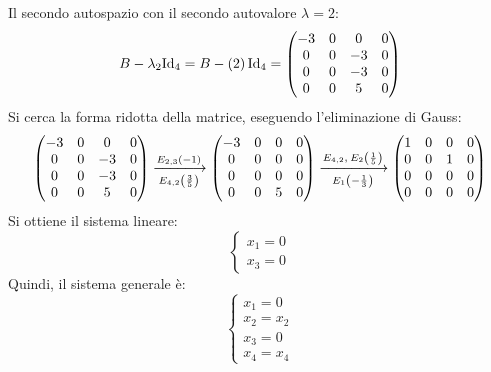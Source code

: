 \documentclass[a4paper]{article}
\makeatletter
\newenvironment{rowequmat}[1]{\left(\array{@{}#1@{}}}{\endarray\right)}
\makeatother
\begin{document}
	\noindent
	Il secondo autospazio con il secondo autovalore $\lambda = 2$:
	\begin{equation*}
		B - \lambda_{2} \mathrm{Id}_{4} = B - \left(2\right) \mathrm{Id}_{4} =
		\begin{rowequmat}{cccc}
				-3	& 0		& 0		& 0 \\
				0	& 0		& -3	& 0 \\
				0	& 0		& -3	& 0 \\
				0	& 0		& 5		& 0
		\end{rowequmat}
	\end{equation*}
	Si cerca la forma ridotta della matrice, eseguendo l'eliminazione di Gauss:
	\begin{equation*}
		\begin{rowequmat}{cccc}
			-3	& 0		& 0		& 0 \\
			0	& 0		& -3	& 0 \\
			0	& 0		& -3	& 0 \\
			0	& 0		& 5		& 0
		\end{rowequmat}
		\xlongrightarrow[E_{4,2}\left(\frac{3}{5}\right)]{E_{2,3}\left(-1\right)}
		\begin{rowequmat}{cccc}
			-3	& 0		& 0		& 0 \\
			0	& 0		& 0		& 0 \\
			0	& 0		& 0		& 0 \\
			0	& 0		& 5		& 0
		\end{rowequmat}
		\xlongrightarrow[E_{1}\left(-\frac{1}{3}\right)]{E_{4,2}, \: E_{2}\left(\frac{1}{5}\right)}
		\begin{rowequmat}{cccc}
			1	& 0		& 0		& 0 \\
			0	& 0		& 1		& 0 \\
			0	& 0		& 0		& 0 \\
			0	& 0		& 0		& 0
		\end{rowequmat}
	\end{equation*}
	Si ottiene il sistema lineare:
	\begin{equation*}
		\begin{cases}
			x_{1} = 0 \\
			x_{3} = 0
		\end{cases}
	\end{equation*}
	Quindi, il sistema generale è:
	\begin{equation*}
		\begin{cases}
			x_{1} = 0		\\
			x_{2} = x_{2} 	\\
			x_{3} = 0		\\
			x_{4} = x_{4}
		\end{cases}
	\end{equation*}
\end{document}
